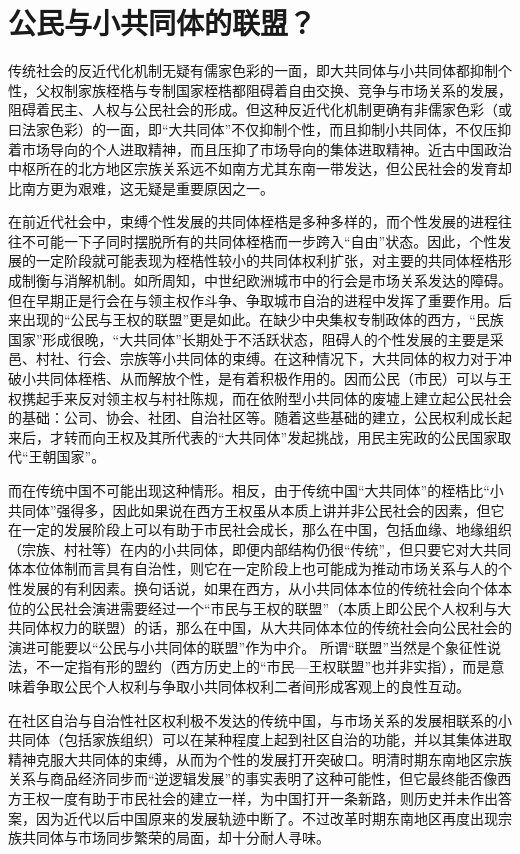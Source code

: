 \documentclass[a4paper,12pt,punct=kaiming,fontset=none]{ctexart}
\begin{document}
\section*{公民与小共同体的联盟？}

传统社会的反近代化机制无疑有儒家色彩的一面，即大共同体与小共同体都抑制个性，父权制家族桎梏与专制国家桎梏都阻碍着自由交换、竞争与市场关系的发展，阻碍着民主、人权与公民社会的形成。但这种反近代化机制更确有非儒家色彩（或曰法家色彩）的一面，即“大共同体”不仅抑制个性，而且抑制小共同体，不仅压抑着市场导向的个人进取精神，而且压抑了市场导向的集体进取精神。近古中国政治中枢所在的北方地区宗族关系远不如南方尤其东南一带发达，但公民社会的发育却比南方更为艰难，这无疑是重要原因之一。

在前近代社会中，束缚个性发展的共同体桎梏是多种多样的，而个性发展的进程往往不可能一下子同时摆脱所有的共同体桎梏而一步跨入“自由”状态。因此，个性发展的一定阶段就可能表现为桎梏性较小的共同体权利扩张，对主要的共同体桎梏形成制衡与消解机制。如所周知，中世纪欧洲城市中的行会是市场关系发达的障碍。但在早期正是行会在与领主权作斗争、争取城市自治的进程中发挥了重要作用。后来出现的“公民与王权的联盟”更是如此。在缺少中央集权专制政体的西方，“民族国家”形成很晚，“大共同体”长期处于不活跃状态，阻碍人的个性发展的主要是采邑、村社、行会、宗族等小共同体的束缚。在这种情况下，大共同体的权力对于冲破小共同体桎梏、从而解放个性，是有着积极作用的。因而公民（市民）可以与王权携起手来反对领主权与村社陈规，而在依附型小共同体的废墟上建立起公民社会的基础：公司、协会、社团、自治社区等。随着这些基础的建立，公民权利成长起来后，才转而向王权及其所代表的“大共同体”发起挑战，用民主宪政的公民国家取代“王朝国家”。

而在传统中国不可能出现这种情形。相反，由于传统中国“大共同体”的桎梏比“小共同体”强得多，因此如果说在西方王权虽从本质上讲并非公民社会的因素，但它在一定的发展阶段上可以有助于市民社会成长，那么在中国，包括血缘、地缘组织（宗族、村社等）在内的小共同体，即便内部结构仍很“传统”，但只要它对大共同体本位体制而言具有自治性，则它在一定阶段上也可能成为推动市场关系与人的个性发展的有利因素。换句话说，如果在西方，从小共同体本位的传统社会向个体本位的公民社会演进需要经过一个“市民与王权的联盟”（本质上即公民个人权利与大共同体权力的联盟）的话，那么在中国，从大共同体本位的传统社会向公民社会的演进可能要以“公民与小共同体的联盟”作为中介。 所谓“联盟”当然是个象征性说法，不一定指有形的盟约（西方历史上的“市民—王权联盟”也并非实指），而是意味着争取公民个人权利与争取小共同体权利二者间形成客观上的良性互动。

在社区自治与自治性社区权利极不发达的传统中国，与市场关系的发展相联系的小共同体（包括家族组织）可以在某种程度上起到社区自治的功能，并以其集体进取精神克服大共同体的束缚，从而为个性的发展打开突破口。明清时期东南地区宗族关系与商品经济同步而“逆逻辑发展”的事实表明了这种可能性，但它最终能否像西方王权一度有助于市民社会的建立一样，为中国打开一条新路，则历史并未作出答案，因为近代以后中国原来的发展轨迹中断了。不过改革时期东南地区再度出现宗族共同体与市场同步繁荣的局面，却十分耐人寻味。
\end{document}
